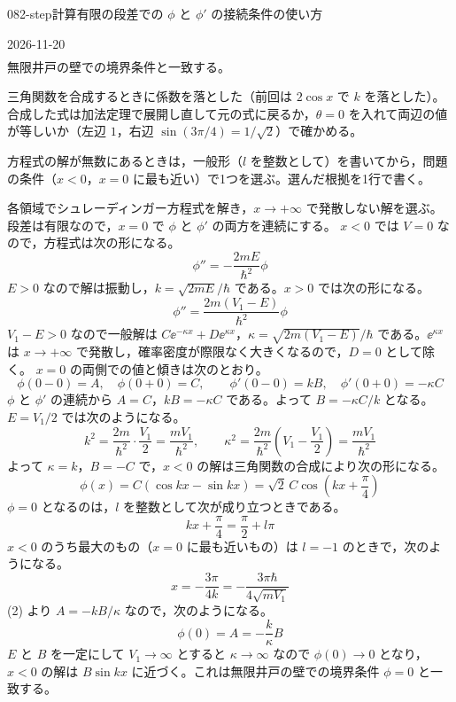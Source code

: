 \documentclass[uplatex,dvipdfmx,a4paper,11pt]{jsarticle}
\begin{document}
\begin{mondai}{082-step}{計算}{有限の段差での $\phi$ と $\phi'$ の接続条件の使い方}
\begin{kotaeutsushi}{2026-11-20}
\begin{align*}
\end{align*}
無限井戸の壁での境界条件と一致する。
\end{kotaeutsushi}
\begin{kizuki}
\item {} 三角関数を合成するときに係数を落とした（前回は $2\cos x$ で $k$ を落とした）。合成した式は加法定理で展開し直して元の式に戻るか，$\theta=0$ を入れて両辺の値が等しいか（左辺 $1$，右辺 $\sin(3\pi/4)=1/\sqrt{2}$）で確かめる。
\item {} 方程式の解が無数にあるときは，一般形（$l$ を整数として）を書いてから，問題の条件（$x<0$，$x=0$ に最も近い）で1つを選ぶ。選んだ根拠を1行で書く。
\end{kizuki}
\begin{tadashii}
\houshin 各領域でシュレーディンガー方程式を解き，$x\to+\infty$ で発散しない解を選ぶ。段差は有限なので，$x=0$ で $\phi$ と $\phi'$ の両方を連続にする。
\keisan
{} $x<0$ では $V=0$ なので，方程式は次の形になる。
\[ \phi''=-\frac{2mE}{\hbar^{2}}\phi \]
$E>0$ なので解は振動し，$k=\sqrt{2mE}/\hbar$ である。$x>0$ では次の形になる。
\[ \phi''=\frac{2m(V_{1}-E)}{\hbar^{2}}\phi \]
$V_{1}-E>0$ なので一般解は $C\ee^{-\kappa x}+D\ee^{\kappa x}$，$\kappa=\sqrt{2m(V_{1}-E)}/\hbar$ である。$\ee^{\kappa x}$ は $x\to+\infty$ で発散し，確率密度が際限なく大きくなるので，$D=0$ として除く。
 $x=0$ の両側での値と傾きは次のとおり。
\[ \phi(0-0)=A,\quad \phi(0+0)=C,\qquad \phi'(0-0)=kB,\quad \phi'(0+0)=-\kappa C \]
$\phi$ と $\phi'$ の連続から $A=C$，$kB=-\kappa C$ である。よって $B=-\kappa C/k$ となる。
 $E=V_{1}/2$ では次のようになる。
\[ k^{2}=\frac{2m}{\hbar^{2}}\cdot\frac{V_{1}}{2}=\frac{mV_{1}}{\hbar^{2}},\qquad \kappa^{2}=\frac{2m}{\hbar^{2}}\left(V_{1}-\frac{V_{1}}{2}\right)=\frac{mV_{1}}{\hbar^{2}} \]
よって $\kappa=k$，$B=-C$ で，$x<0$ の解は三角関数の合成により次の形になる。
\[ \phi(x)=C(\cos kx-\sin kx)=\sqrt{2}\,C\cos\left(kx+\frac{\pi}{4}\right) \]
$\phi=0$ となるのは，$l$ を整数として次が成り立つときである。
\[ kx+\frac{\pi}{4}=\frac{\pi}{2}+l\pi \]
$x<0$ のうち最大のもの（$x=0$ に最も近いもの）は $l=-1$ のときで，次のようになる。
\[ x=-\frac{3\pi}{4k}=-\frac{3\pi\hbar}{4\sqrt{mV_{1}}} \]
 (2) より $A=-kB/\kappa$ なので，次のようになる。
\[ \phi(0)=A=-\frac{k}{\kappa}B \]
$E$ と $B$ を一定にして $V_{1}\to\infty$ とすると $\kappa\to\infty$ なので $\phi(0)\to 0$ となり，$x<0$ の解は $B\sin kx$ に近づく。これは無限井戸の壁での境界条件 $\phi=0$ と一致する。

\end{tadashii}
\end{mondai}
\end{document}
